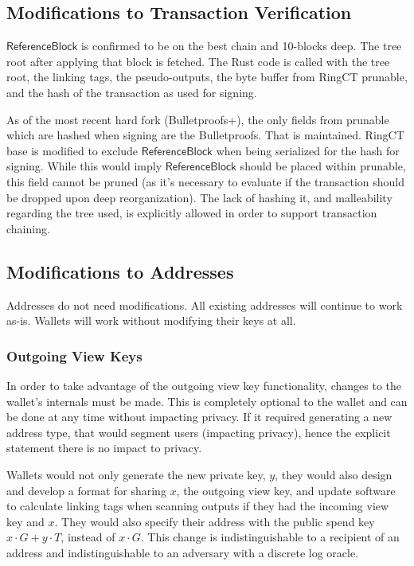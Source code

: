 \documentclass[]{article}
\begin{document}
\subsection{Modifications to Transaction Verification}

$\mathsf{ReferenceBlock}$ is confirmed to be on the best chain and 10-blocks deep. The tree root after applying that block is fetched. The Rust code is called with the tree root, the linking tags, the pseudo-outputs, the byte buffer from RingCT prunable, and the hash of the transaction as used for signing.

As of the most recent hard fork (Bulletproofs+), the only fields from prunable which are hashed when signing are the Bulletproofs. That is maintained. RingCT base is modified to exclude $\mathsf{ReferenceBlock}$ when being serialized for the hash for signing. While this would imply $\mathsf{ReferenceBlock}$ should be placed within prunable, this field cannot be pruned (as it's necessary to evaluate if the transaction should be dropped upon deep reorganization). The lack of hashing it, and malleability regarding the tree used, is explicitly allowed in order to support transaction chaining.

\subsection{Modifications to Addresses}

Addresses do not need modifications. All existing addresses will continue to work as-is. Wallets will work without modifying their keys at all.

\subsubsection{Outgoing View Keys}

In order to take advantage of the outgoing view key functionality, changes to the wallet's internals must be made. This is completely optional to the wallet and can be done at any time without impacting privacy. If it required generating a new address type, that would segment users (impacting privacy), hence the explicit statement there is no impact to privacy.

Wallets would not only generate the new private key, $y$, they would also design and develop a format for sharing $x$, the outgoing view key, and update software to calculate linking tags when scanning outputs if they had the incoming view key and $x$. They would also specify their address with the public spend key $x \cdot G + y \cdot T$, instead of $x \cdot G$. This change is indistinguishable to a recipient of an address and indistinguishable to an adversary with a discrete log oracle.
\end{document}
